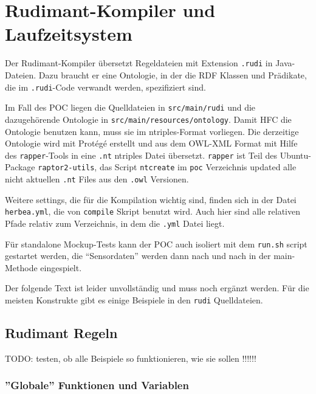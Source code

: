 \section{Rudimant-Kompiler und Laufzeitsystem}

Der Rudimant-Kompiler übersetzt Regeldateien mit Extension \texttt{.rudi} in
Java-Dateien. Dazu braucht er eine Ontologie, in der die RDF Klassen und
Prädikate, die im \texttt{.rudi}-Code verwandt werden, spezifiziert sind.

Im Fall des POC liegen die Quelldateien in \texttt{src/main/rudi} und die
dazugehörende Ontologie in \texttt{src/main/resources/ontology}. Damit HFC
die Ontologie benutzen kann, muss sie im ntriples-Format vorliegen. Die
derzeitige Ontologie wird mit Protégé erstellt und aus dem OWL-XML Format
mit Hilfe des \texttt{rapper}-Tools in eine \texttt{.nt} ntriples Datei
übersetzt. \texttt{rapper} ist Teil des Ubuntu-Package \texttt{raptor2-utils},
das Script \texttt{ntcreate} im \texttt{poc} Verzeichnis updated alle nicht
aktuellen \texttt{.nt} Files aus den \texttt{.owl} Versionen.

Weitere settings, die für die Kompilation wichtig sind, finden sich in der
Datei \texttt{herbea.yml}, die von \texttt{compile} Skript benutzt wird. Auch
hier sind alle relativen Pfade relativ zum Verzeichnis, in dem die
\texttt{.yml} Datei liegt.

Für standalone Mockup-Tests kann der POC auch isoliert mit dem \texttt{run.sh}
script gestartet werden, die ``Sensordaten'' werden dann nach und nach in
der main-Methode eingespielt.

Der folgende Text ist leider unvollständig und muss noch ergänzt werden. Für
die meisten Konstrukte gibt es einige Beispiele in den \texttt{rudi}
Quelldateien.

\subsection{Rudimant Regeln}

{\Huge TODO: testen, ob alle Beispiele so funktionieren, wie sie sollen !!!!!!}

\subsubsection{''Globale'' Funktionen und Variablen}


